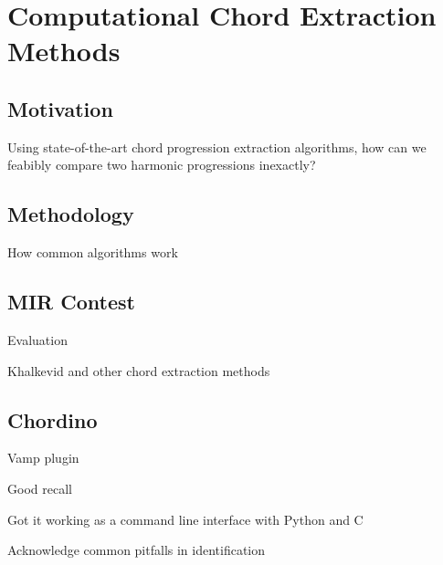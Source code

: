 \section{Computational Chord Extraction Methods}

\subsection{Motivation}

\item Using state-of-the-art chord progression extraction algorithms, how can we feabibly compare two harmonic progressions inexactly?

\subsection{Methodology}

\item How common algorithms work

\subsection{MIR Contest}

\item Evaluation
\item Khalkevid and other chord extraction methods

\subsection{Chordino}

\item Vamp plugin
\item Good recall
\item Got it working as a command line interface with Python and C
\item Acknowledge common pitfalls in identification